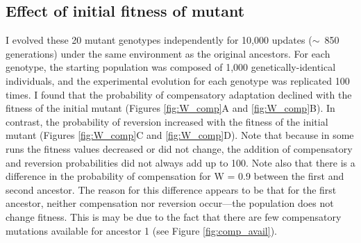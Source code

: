 \begin{doublespace}
\subsection{Effect of initial fitness of mutant}

I evolved these 20 mutant genotypes independently
for 10,000 updates ($\sim$~850 generations)
under the same environment as the original ancestors.
%
For each genotype, the starting population
was composed of 1,000 genetically-identical individuals,
and the experimental evolution for each genotype was replicated 100 times.
%
I found that the probability of compensatory adaptation
declined with the fitness of the initial mutant
(Figures \ref{fig:W_comp}A and \ref{fig:W_comp}B).
%
In contrast, the probability of reversion
increased with the fitness of the initial mutant
(Figures \ref{fig:W_comp}C and \ref{fig:W_comp}D).
%
Note that because in some runs the fitness values decreased or did not change,
the addition of compensatory and reversion probabilities
did not always add up to 100.
%
Note also that there is a difference in the probability of compensation
for W = 0.9 between the first and second ancestor.
%
The reason for this difference appears to be that
for the first ancestor, neither compensation nor reversion
occur---the population does not change fitness.
%
This is may be due to the fact that there are few compensatory mutations
available for ancestor 1 (see Figure \ref{fig:comp_avail}).




\end{doublespace}
